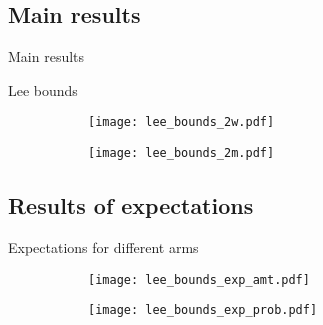 \documentclass[8pt]{beamer}
\begin{document}
\subsection{Main results}
\begin{frame}{Main results}

 \begin{table}[H] 
 \begin{subtable}{1.\textwidth}
 \begin{center}
 \tiny{}
 \end{center}
 \end{subtable}
 \end{table}  
 
\end{frame}

\begin{frame}{Lee bounds}

\begin{figure}[H]
    \caption{Lee Bounds}
    \label{lee_bounds}
    \begin{center}
        \begin{subfigure}{0.49\textwidth}
            \centering
            \texttt{[image: lee\_bounds\_2w.pdf]}
        \end{subfigure}
        \begin{subfigure}{0.49\textwidth}
                \centering
                \texttt{[image: lee\_bounds\_2m.pdf]}
        \end{subfigure}
    \end{center} 
\end{figure} 
 
\end{frame}

\subsection{Results of expectations}
\begin{frame}{Expectations for different arms}

\begin{figure}[H]
    \begin{center}
        \begin{subfigure}{0.49\textwidth}
            \centering
            \texttt{[image: lee\_bounds\_exp\_amt.pdf]}
        \end{subfigure}
        \begin{subfigure}{0.49\textwidth}
                \centering
                \texttt{[image: lee\_bounds\_exp\_prob.pdf]}
        \end{subfigure}
    \end{center} 
\end{figure} 
\end{frame}
\end{document}
